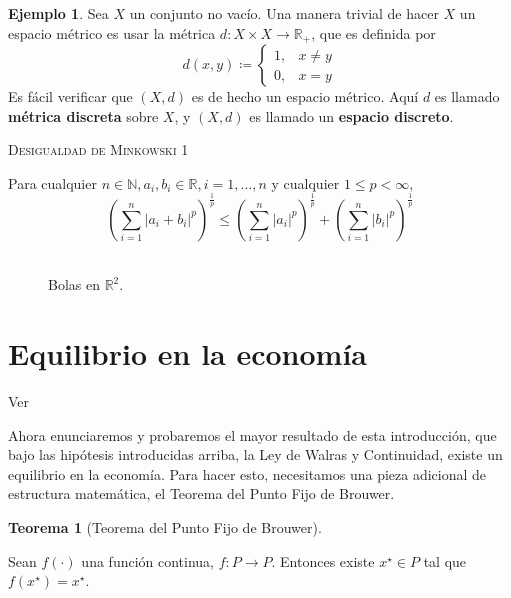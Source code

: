 \documentclass[10pt,a4paper]{article}
\theoremstyle{definition}
\newtheorem{theorem}{Teorema}[section]
\newtheorem{example}{Ejemplo}
\newcommand{\brouwer}{Teorema del Punto Fijo de Brouwer}
\newcommand{\walras}{Ley de Walras y Continuidad}
\begin{document}
\begin{example}

Sea $X$ un conjunto no vacío. Una manera trivial de hacer $X$ un espacio métrico es usar la métrica $d:X\times X\rightarrow\mathbb{R}_+$, que es definida por
$$
d(x,y)\coloneqq\begin{cases}
1,&x\neq y\\
0,& x=y
\end{cases}
$$
Es fácil verificar que $(X,d)$ es de hecho un espacio métrico. Aquí $d$ es llamado \textbf{métrica discreta} sobre $X$, y $(X,d)$ es llamado un \textbf{espacio discreto}.
\end{example}


\newpage
\setcounter{page}{2}

\begin{mdframed}[style=minkowski]
	\vspace*{3mm}
	\color{Violet}
	\textsc{Desigualdad de Minkowski 1}
	
	\noindent
	Para cualquier $n\in\mathbb{N}, a_i, b_i\in\mathbb{R}, i=1,\ldots,n$ y cualquier $1\leq p<\infty$,
	\
	$$
	{\left(\sum_{i=1}^{n}{\left\lvert a_i+b_i\right\rvert}^{p}\right)}^{\frac{1}{p}}\leq
	{\left(\sum_{i=1}^{n}{\left\lvert a_i\right\rvert}^{p}\right)}^{\frac{1}{p}}+
	{\left(\sum_{i=1}^{n}{\left\lvert b_i\right\rvert}^{p}\right)}^{\frac{1}{p}}
	$$
	\
\end{mdframed}

\begin{figure}[H]
	\centering
	\scalebox{.5}{}
	\caption{Bolas en $\mathbb{R}^2$.}
\end{figure}

\section[Equilibrio]{Equilibrio en la economía}

Ver \cite[Capítulo 5]{Starr2011}

{
\sffamily\LARGE
Ahora enunciaremos y probaremos el mayor resultado de esta introducción, que bajo las hipótesis introducidas arriba, la \walras, existe un equilibrio en la economía. Para hacer esto, necesitamos una pieza adicional de estructura matemática, el \brouwer.
}

\begin{theorem}[\brouwer]\label{eq:brouwer}

Sean $f(\cdot)$ una función continua, $f:P\rightarrow P$. Entonces existe $x^{\star}\in P$ tal que $f(x^{\star})=x^{\star}$.

\end{theorem}
\end{document}
